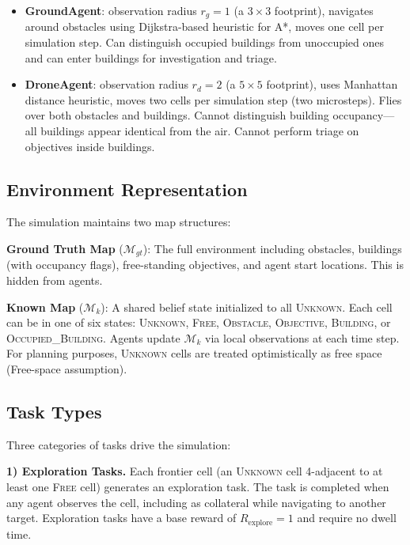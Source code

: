 \documentclass[conference]{IEEEtran}
\begin{document}
\begin{itemize}
    \item \textbf{GroundAgent}: observation radius $r_g = 1$ (a $3 \times 3$ footprint), navigates around obstacles using Dijkstra-based heuristic for A*, moves one cell per simulation step. Can distinguish occupied buildings from unoccupied ones and can enter buildings for investigation and triage.
    \item \textbf{DroneAgent}: observation radius $r_d = 2$ (a $5 \times 5$ footprint), uses Manhattan distance heuristic, moves two cells per simulation step (two microsteps). Flies over both obstacles and buildings. Cannot distinguish building occupancy---all buildings appear identical from the air. Cannot perform triage on objectives inside buildings.
\end{itemize}

\subsection{Environment Representation}

The simulation maintains two map structures:

\textbf{Ground Truth Map} ($\mathcal{M}_{gt}$): The full environment including obstacles, buildings (with occupancy flags), free-standing objectives, and agent start locations. This is hidden from agents.

\textbf{Known Map} ($\mathcal{M}_{k}$): A shared belief state initialized to all \textsc{Unknown}. Each cell can be in one of six states: \textsc{Unknown}, \textsc{Free}, \textsc{Obstacle}, \textsc{Objective}, \textsc{Building}, or \textsc{Occupied\_Building}. Agents update $\mathcal{M}_{k}$ via local observations at each time step. For planning purposes, \textsc{Unknown} cells are treated optimistically as free space (Free-space assumption).

\subsection{Task Types}

Three categories of tasks drive the simulation:

\textbf{1) Exploration Tasks.} Each frontier cell (an \textsc{Unknown} cell 4-adjacent to at least one \textsc{Free} cell) generates an exploration task. The task is completed when any agent observes the cell, including as collateral while navigating to another target. Exploration tasks have a base reward of $R_{\text{explore}} = 1$ and require no dwell time.
\end{document}

